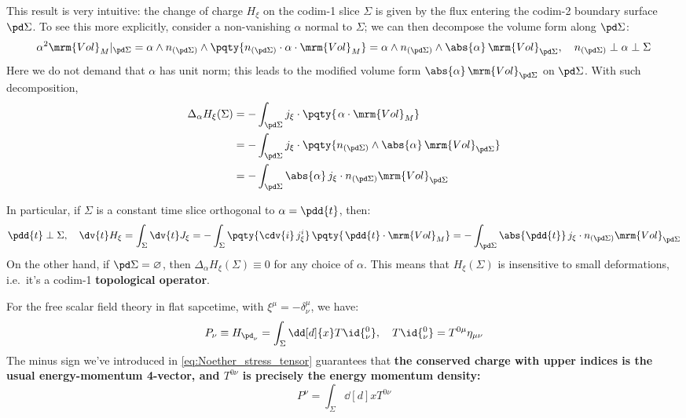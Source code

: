 \documentclass[a4paper
	,10pt
]{article}
\begin{document}
	This result is very intuitive: the change of charge $H_\xi$ on the codim-1 slice $\Sigma$ is given by the flux entering the codim-2 boundary surface $\pd\Sigma$. 
	To see this more explicitly, consider a non-vanishing $\alpha$ normal to $\Sigma$; we can then decompose the volume form along $\pd\Sigma$:
	\begin{equation}
		\alpha^2 \mrm{Vol}_M|_{\pd\Sigma}
		= \alpha\wedge n_{(\pd\Sigma)}
			\wedge \pqty{
				n_{(\pd\Sigma)}
				\cdot \alpha
				\cdot \mrm{Vol}_M
			}
		= \alpha\wedge n_{(\pd\Sigma)}
			\wedge \abs{\alpha}\,\mrm{Vol}_{\pd\Sigma},
	\quad
		n_{(\pd\Sigma)} \perp \alpha
		\perp \Sigma
	\end{equation}
	Here we do not demand that $\alpha$ has unit norm; this leads to the modified volume form $\abs{\alpha}\,\mrm{Vol}_{\pd\Sigma}$ on $\pd\Sigma$. 
	With such decomposition,
	\begin{equation}
	\begin{aligned}
		\Delta_{\alpha} H_\xi(\Sigma)
		&= - \int_{\pd\Sigma}
			j_\xi \cdot \pqty{\mspace{2mu}
				\alpha \cdot \mrm{Vol}_M
			} \\
		&= - \int_{\pd\Sigma}
			j_\xi \cdot \pqty{
				n_{(\pd\Sigma)} \wedge 
				\abs{\alpha}\,\mrm{Vol}_{\pd\Sigma}
			} \\
		&= - \int_{\pd\Sigma} \abs{\alpha}\,
			j_\xi \cdot n_{(\pd\Sigma)}
			\mrm{Vol}_{\pd\Sigma}
	\end{aligned}
	\end{equation}
	
	In particular, if $\Sigma$ is a constant time slice orthogonal to $\alpha = \pdd{t}$, then:
	\begin{equation}
		\pdd{t} \perp \Sigma,
	\quad
		\dv{t} H_\xi
		= \int_\Sigma \dv{t} J_\xi
		= - \int_\Sigma
			\pqty{\cdv{i}\,j^i_\xi}\,
			\pqty{\mspace{2mu}
				\pdd{t} \cdot \mrm{Vol}_M
			}
		= - \int_{\pd\Sigma} \abs{\pdd{t}}\,
			j_\xi \cdot n_{(\pd\Sigma)}
			\mrm{Vol}_{\pd\Sigma}
	\end{equation}
	On the other hand, if $\pd\Sigma = \varnothing$, then $\Delta_{\alpha} H_\xi(\Sigma) \equiv 0$ for any choice of $\alpha$. This means that $H_\xi(\Sigma)$ is insensitive to small deformations, i.e.~it's a codim-1 \textbf{topological operator}. 
	
\pagebreak[3]
	
	For the free scalar field theory in flat sapcetime, with $\xi^\mu = -\delta^\mu_\nu$, we have:
	\begin{equation}
		P_\nu \equiv H_{\pd_\nu}
		= \int_\Sigma \dd[d]{x} T\id{^0_\nu},
	\quad
		T\id{^0_\nu}
		= T^{0\mu} \eta_{\mu\nu}
	\end{equation}
	The minus sign we've introduced in \eqref{eq:Noether_stress_tensor} guarantees that \textbf{the conserved charge with upper indices is the usual energy-momentum 4-vector, and $T^{0\nu}$ is precisely the energy momentum density:}
	\begin{equation}
		P^\nu = \int_\Sigma \dd[d]{x} T^{0\nu}
	\end{equation}
	
\end{document}
